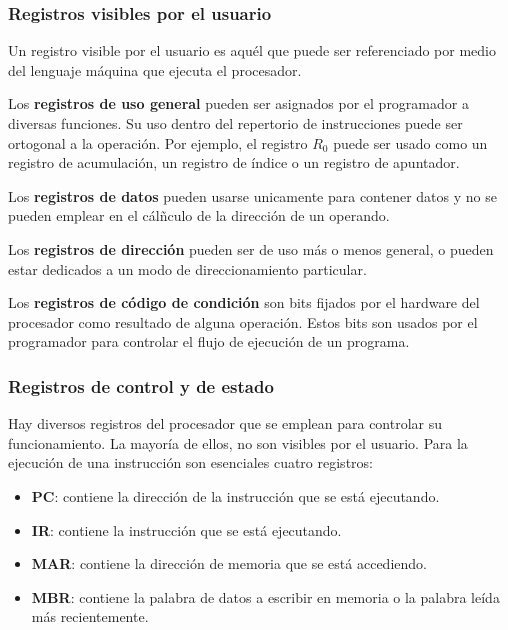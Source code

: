 \begin{subs}
  \subsubsection{Registros visibles por el usuario}
  Un registro visible por el usuario es aquél que puede ser referenciado por medio del lenguaje máquina que ejecuta el procesador.

  Los \textbf{registros de uso general} pueden ser asignados por el programador a diversas funciones. Su uso dentro del repertorio de instrucciones puede ser ortogonal a la operación. Por ejemplo, el registro $R_0$ puede ser usado como un registro de acumulación, un registro de índice o un registro de apuntador.

  Los \textbf{registros de datos} pueden usarse unicamente para contener datos y no se pueden emplear en el cálñculo de la dirección de un operando.

  Los \textbf{registros de dirección} pueden ser de uso más o menos general, o pueden estar dedicados a un modo de direccionamiento particular.

  Los \textbf{registros de código de condición} son bits fijados por el hardware del procesador como resultado de alguna operación. Estos bits son usados por el programador para controlar el flujo de ejecución de un programa.

  \subsubsection{Registros de control y de estado}

  Hay diversos registros del procesador que se emplean para controlar su funcionamiento. La mayoría de ellos, no son visibles por el usuario. 
  Para la ejecución de una instrucción son esenciales cuatro registros:

  \begin{itemize}
    \item \textbf{PC}: contiene la dirección de la instrucción que se está ejecutando.
    \item \textbf{IR}: contiene la instrucción que se está ejecutando.
    \item \textbf{MAR}: contiene la dirección de memoria que se está accediendo.
    \item \textbf{MBR}: contiene la palabra de datos a escribir en memoria o la palabra leída más recientemente.
  \end{itemize}
\end{subs}

